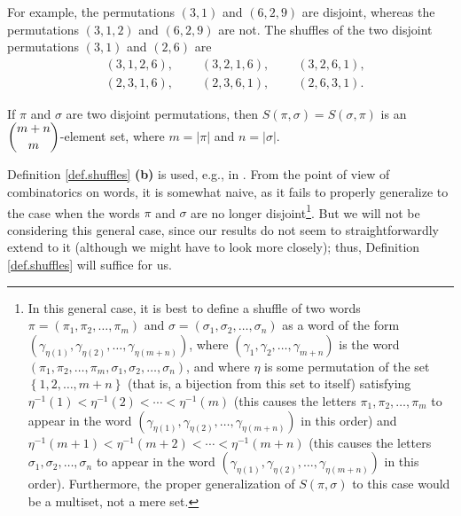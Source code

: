 \documentclass[numbers=enddot,12pt,final,onecolumn,notitlepage]{scrartcl}%
\theoremstyle{definition}
\begin{document}
For example, the permutations $\left(  3,1\right)  $ and $\left(
6,2,9\right)  $ are disjoint, whereas the permutations $\left(  3,1,2\right)
$ and $\left(  6,2,9\right)  $ are not. The shuffles of the two disjoint
permutations $\left(  3,1\right)  $ and $\left(  2,6\right)  $ are%
\begin{align*}
&  \left(  3,1,2,6\right)  ,\ \ \ \ \ \ \ \ \ \ \left(  3,2,1,6\right)
,\ \ \ \ \ \ \ \ \ \ \left(  3,2,6,1\right)  ,\\
&  \left(  2,3,1,6\right)  ,\ \ \ \ \ \ \ \ \ \ \left(  2,3,6,1\right)
,\ \ \ \ \ \ \ \ \ \ \left(  2,6,3,1\right)  .
\end{align*}


If $\pi$ and $\sigma$ are two disjoint permutations, then $S\left(  \pi
,\sigma\right)  =S\left(  \sigma,\pi\right)  $ is an $\dbinom{m+n}{m}$-element
set, where $m=\left\vert \pi\right\vert $ and $n=\left\vert \sigma\right\vert
$.

Definition \ref{def.shuffles} \textbf{(b)} is used, e.g., in \cite{Greene88}.
From the point of view of combinatorics on words, it is somewhat naive, as it
fails to properly generalize to the case when the words $\pi$ and $\sigma$ are
no longer disjoint\footnote{In this general case, it is best to define a
shuffle of two words $\pi=\left(  \pi_{1},\pi_{2},\ldots,\pi_{m}\right)  $ and
$\sigma=\left(  \sigma_{1},\sigma_{2},\ldots,\sigma_{n}\right)  $ as a word of
the form $\left(  \gamma_{\eta\left(  1\right)  },\gamma_{\eta\left(
2\right)  },\ldots,\gamma_{\eta\left(  m+n\right)  }\right)  $, where $\left(
\gamma_{1},\gamma_{2},\ldots,\gamma_{m+n}\right)  $ is the word $\left(
\pi_{1},\pi_{2},\ldots,\pi_{m},\sigma_{1},\sigma_{2},\ldots,\sigma_{n}\right)
$, and where $\eta$ is some permutation of the set $\left\{  1,2,\ldots
,m+n\right\}  $ (that is, a bijection from this set to itself) satisfying
$\eta^{-1}\left(  1\right)  <\eta^{-1}\left(  2\right)  <\cdots<\eta
^{-1}\left(  m\right)  $ (this causes the letters $\pi_{1},\pi_{2},\ldots
,\pi_{m}$ to appear in the word $\left(  \gamma_{\eta\left(  1\right)
},\gamma_{\eta\left(  2\right)  },\ldots,\gamma_{\eta\left(  m+n\right)
}\right)  $ in this order) and $\eta^{-1}\left(  m+1\right)  <\eta^{-1}\left(
m+2\right)  <\cdots<\eta^{-1}\left(  m+n\right)  $ (this causes the letters
$\sigma_{1},\sigma_{2},\ldots,\sigma_{n}$ to appear in the word $\left(
\gamma_{\eta\left(  1\right)  },\gamma_{\eta\left(  2\right)  },\ldots
,\gamma_{\eta\left(  m+n\right)  }\right)  $ in this order). Furthermore, the
proper generalization of $S\left(  \pi,\sigma\right)  $ to this case would be
a multiset, not a mere set.}. But we will not be considering this general
case, since our results do not seem to straightforwardly extend to it
(although we might have to look more closely); thus, Definition
\ref{def.shuffles} will suffice for us.
\end{document}
